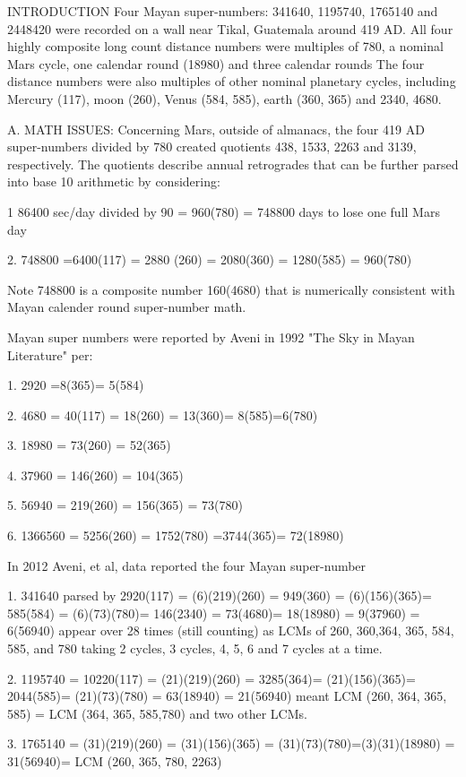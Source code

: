 \documentclass[12pt]{article}
\begin{document}
INTRODUCTION Four Mayan super-numbers:  341640, 1195740, 1765140 and 2448420 were recorded on a wall near Tikal, Guatemala around 419 AD. All four highly composite long count distance numbers were multiples of 780, a nominal Mars cycle, one calendar round (18980) and three calendar rounds The four distance numbers were also multiples of other nominal planetary cycles, including Mercury (117), moon (260), Venus (584, 585), earth (360, 365) and 2340, 4680.

A. MATH ISSUES: Concerning Mars, outside of almanacs, the four 419 AD super-numbers divided by 780 created quotients 438, 1533,  2263 and 3139, respectively. The quotients describe annual retrogrades that can be further parsed into base 10 arithmetic by considering:

1 86400 sec/day divided by 90 = 960(780) = 748800 days to lose one full Mars day 

2. 748800 =6400(117) = 2880 (260) = 2080(360) = 1280(585) = 960(780)

Note 748800 is a composite number 160(4680) that is numerically  consistent with Mayan calender round super-number math. 

Mayan super numbers were reported by Aveni in 1992 "The Sky in Mayan Literature" per:

1. 2920 =8(365)= 5(584)

2. 4680 = 40(117) = 18(260) = 13(360)= 8(585)=6(780)

3. 18980 = 73(260) = 52(365) 

4. 37960 = 146(260) = 104(365) 

5. 56940 = 219(260) = 156(365) =  73(780)

6. 1366560 = 5256(260) = 1752(780) =3744(365)= 72(18980)

In 2012 Aveni, et al, data reported the four Mayan super-number

1. 341640 parsed by  2920(117) = (6)(219)(260) = 949(360) = (6)(156)(365)= 585(584) = (6)(73)(780)= 146(2340) = 73(4680)= 18(18980) = 9(37960) = 6(56940) appear over 28 times (still counting)  as LCMs of 260, 360,364, 365, 584, 585, and 780 taking 2 cycles, 3 cycles, 4, 5, 6 and 7 cycles at a time.

2. 1195740 = 10220(117) = (21)(219)(260) = 3285(364)= (21)(156)(365)= 2044(585)= (21)(73)(780) = 63(18940) = 21(56940) meant LCM (260, 364, 365, 585) = LCM (364, 365, 585,780) and two other LCMs.

3. 1765140 = (31)(219)(260) = (31)(156)(365) = (31)(73)(780)=(3)(31)(18980) = 31(56940)= LCM (260, 365, 780, 2263)
\end{document}

